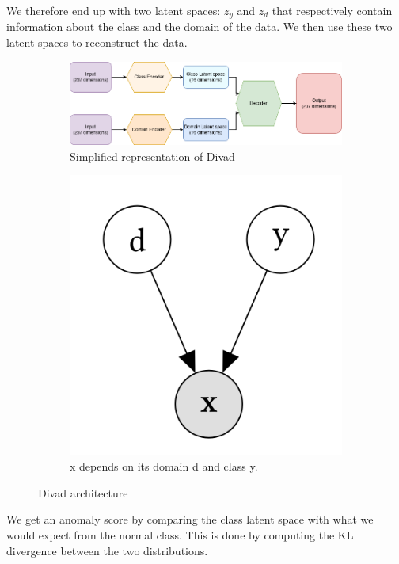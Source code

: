 \documentclass[oneside, a4paper, onecolumn, 11pt]{article}
\begin{document}
We therefore end up with two latent spaces: $z_y$ and $z_d$ that respectively contain information about the class and the domain of the data. We then use these two latent spaces to reconstruct the data.
\begin{figure}[H]
  \centering
  \begin{subfigure}{0.6\textwidth}
      \centering
      \includegraphics[width=\linewidth]{images/divad_simple.png}
      \caption{Simplified representation of Divad}
      \label{fig:divad_simple}
  \end{subfigure}
  \begin{subfigure}{0.2\textwidth}
      \centering
      \includegraphics[width=\linewidth]{images/divad_assum.png}
      \caption{ x depends on its domain d and class y.}
      \label{fig:divad_assum}
  \end{subfigure}
  \caption{Divad architecture}
\end{figure}
We get an anomaly score by comparing the class latent space with what we would expect from the normal class. This is done by computing the KL divergence between the two distributions.\\
\end{document}
